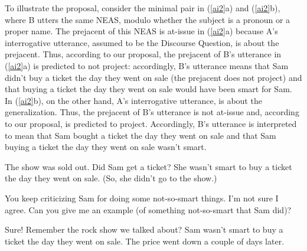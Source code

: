\documentclass[11pt,fleqn]{article}
\newcommand{\6}{\mbox{$[\hspace*{-.6mm}[$}}
\newcommand{\9}{\mbox{$]\hspace*{-.6mm}]$}}
\begin{document}
To illustrate the proposal, consider the minimal pair in (\ref{ai2}a) and (\ref{ai2}b), where B utters the same NEAS, modulo whether the subject is a pronoun or a proper name. The prejacent of this NEAS is at-issue in (\ref{ai2}a) because A's interrogative utterance, assumed to be the Discourse Question, is about the prejacent. Thus, according to our proposal, the prejacent of B's utterance in (\ref{ai2}a) is predicted to not project: accordingly, B's utterance means that Sam didn't buy a ticket the day they went on sale (the prejacent does not project) and that buying a ticket the day they went on sale would have been smart for Sam. In (\ref{ai2}b), on the other hand, A's interrogative utterance, is about the generalization. Thus, the prejacent of B's utterance is not at-issue and, according to our proposal, is predicted to project. Accordingly, B's utterance is interpreted to mean that Sam bought a ticket the day they went on sale and that Sam buying a ticket the day they went on sale wasn't smart. 


\begin{exe}
\ex\label{ai2}

\begin{xlist}
\ex
\begin{xlist}
 The show was sold out. Did Sam get a ticket?
 She wasn't smart to buy a ticket the day they went on sale. (So, she didn't go to the show.)
\end{xlist}

\ex
\begin{xlist}

 You keep criticizing Sam for doing some not-so-smart things. I'm not sure I agree. Can you give me an example (of something not-so-smart that Sam did)?


 Sure! Remember the rock show we talked about? Sam wasn't smart to buy a ticket the day they went on sale. The price went down a couple of days later.

%

\end{xlist}

\end{xlist}
\end{exe}
\end{document}
